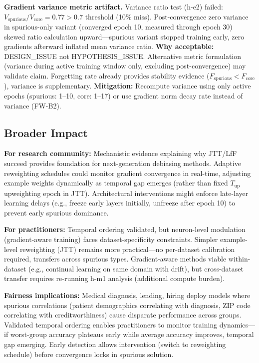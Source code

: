 \textbf{Gradient variance metric artifact.} Variance ratio test (h-e2) failed: $V_{\text{spurious}} / V_{\text{core}} = 0.77 > 0.7$ threshold (10\% miss). Post-convergence zero variance in spurious-only variant (converged epoch 10, measured through epoch 30) skewed ratio calculation upward---spurious variant stopped training early, zero gradients afterward inflated mean variance ratio. \textbf{Why acceptable:} DESIGN\_ISSUE not HYPOTHESIS\_ISSUE. Alternative metric formulation (variance during active training window only, excluding post-convergence) may validate claim. Forgetting rate already provides stability evidence ($F_{\text{spurious}} < F_{\text{core}}$), variance is supplementary. \textbf{Mitigation:} Recompute variance using only active epochs (spurious: 1--10, core: 1--17) or use gradient norm decay rate instead of variance (FW-B2).

\subsection{Broader Impact}

\textbf{For research community:} Mechanistic evidence explaining why JTT/LfF succeed provides foundation for next-generation debiasing methods. Adaptive reweighting schedules could monitor gradient convergence in real-time, adjusting example weights dynamically as temporal gap emerges (rather than fixed $T_{\text{up}}$ upweighting epoch in JTT). Architectural interventions might enforce late-layer learning delays (e.g., freeze early layers initially, unfreeze after epoch 10) to prevent early spurious dominance.

\textbf{For practitioners:} Temporal ordering validated, but neuron-level modulation (gradient-aware training) faces dataset-specificity constraints. Simpler example-level reweighting (JTT) remains more practical---no per-dataset calibration required, transfers across spurious types. Gradient-aware methods viable within-dataset (e.g., continual learning on same domain with drift), but cross-dataset transfer requires re-running h-m1 analysis (additional compute burden).

\textbf{Fairness implications:} Medical diagnosis, lending, hiring deploy models where spurious correlations (patient demographics correlating with diagnosis, ZIP code correlating with creditworthiness) cause disparate performance across groups. Validated temporal ordering enables practitioners to monitor training dynamics---if worst-group accuracy plateaus early while average accuracy improves, temporal gap emerging. Early detection allows intervention (switch to reweighting schedule) before convergence locks in spurious solution.
